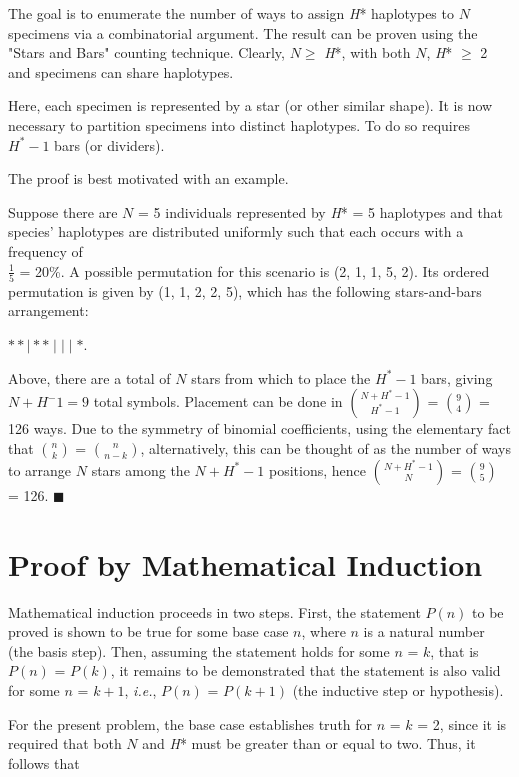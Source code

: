 The goal is to enumerate the number of ways to assign \textit{H}* haplotypes to $N$ specimens via a combinatorial argument. The result can be proven using the "Stars and Bars" counting technique. Clearly, $N \geq$ \textit{H}*, with both $N$, \textit{H}* $\geq$ 2 and specimens can share haplotypes. 

Here, each specimen is represented by a star (or other similar shape). It is now necessary to partition specimens into distinct haplotypes. To do so requires $H^* - 1$ bars (or dividers). 

The proof is best motivated with an example.

Suppose there are $N$ = 5 individuals represented by \textit{H}* = 5 haplotypes and that species' haplotypes are distributed uniformly such that each occurs with a frequency of \\ $\frac{1}{5}$ = 20\%. A possible permutation for this scenario is (2, 1, 1, 5, 2). Its ordered permutation is given by (1, 1, 2, 2, 5), which has the following stars-and-bars arrangement:

\begin{center}
$* * \mid * * \mid \mid \mid *$.
\end{center}

\noindent Above, there are a total of $N$ stars from which to place the $H^* - 1$ bars, giving $N + H^ - 1 = 9$ total symbols. Placement can be done in ${N + H^* - 1}\choose{H^* - 1}$ = ${9}\choose{4}$ = 126 ways. Due to the symmetry of binomial coefficients, using the elementary fact that ${n}\choose{k}$ = ${n}\choose{n-k}$, alternatively, this can be thought of as the number of ways to arrange $N$ stars among the $N + H^* - 1$ positions, hence ${N + H^* - 1}\choose{N}$ = ${9}\choose{5}$ = 126. $\blacksquare$ 

\section{Proof by Mathematical Induction}

Mathematical induction proceeds in two steps. First, the statement $P(n)$ to be proved is shown to be true for some base case $n$, where $n$ is a natural number (the basis step). Then, assuming the statement holds for some $n$ = $k$, that is $P(n)$ = $P(k)$, it remains to be demonstrated that the statement is also valid for some $n$ = $k+1$, \textit{i.e.}, $P(n)$ = $P(k+1)$ (the inductive step or hypothesis).

For the present problem, the base case establishes truth for $n$ = $k$ = 2, since it is required that both $N$ and \textit{H}* must be greater than or equal to two. Thus, it follows that

